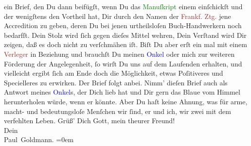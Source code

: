                ein Brief, den Du dann beifügſt, wenn Du das \textcolor{green}{Manuſkript}{} einem \label{K_L02709-6v}\label{K_L02709-6h} einſchickſt und der
               wenigſtens den Vortheil hat, Dir durch den Namen der \textcolor{brown}{Frankf. Ztg.}{}\ledrightnote{\textcolor{brown}{Frankfurter Zeitung}} jene Accredition zu geben, deren Du bei jenen urtheilsloſen
               Buch-Handwerkern noch bedarfſt. Dein Stolz wird ſich gegen dieſes Mittel wehren, Dein
               Verſtand wird Dir zeigen, daß es doch {\pb}nicht zu
               verſchmähen iſt. Biſt Du aber erſt ein mal mit einem \textcolor{brown}{Verleger}{} in Beziehung und brauchſt Du meinen \textcolor{blue}{Onkel}{} oder mich zur weiteren
               Förderung der Angelegenheit, ſo wirſt Du uns auf dem Laufenden erhalten, und
               vielleicht ergibt ſich am Ende doch die Möglichkeit, etwas Poſitiveres und
               Specielleres zu erwirken.\pend
           \pstart
           Der Brief folgt anbei. {\pb}Nimm' dieſen Brief auch als Antwort meines \textcolor{blue}{Onkel}{}s, der Dich lieb hat und
               Dir gern das Blaue vom Himmel herunterholen würde, wenn er könnte. Aber Du haſt keine
               Ahnung, was für arme, macht- und bedeutungsloſe
               Menſchen wir ſind, er und ich, wir zwei mit dem verfehlten Leben.\pend
           \pstart
           Grüß’ Dich Gott, mein theurer Freund! {\\[\baselineskip]}Dein {\\[\baselineskip]}\spacefill\mbox{Paul Goldmann.}\pend
           \leftskip=0em{}\endnumbering{}\begin{anhang}\end{anhang}
      